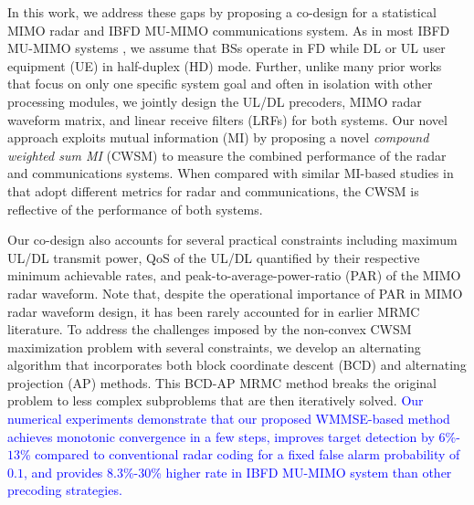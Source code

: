 \documentclass[9pt,journal]{IEEEtran}
\theoremstyle{definition}
\begin{document}
In this work, we address these gaps by proposing a co-design for a statistical MIMO radar and IBFD MU-MIMO communications system. As in most IBFD MU-MIMO systems \cite{biswas2018fdqos,singh2018transceiver,FD_WMMSE}, we assume that BSs operate in FD while DL or UL user equipment (UE) in half-duplex (HD) mode. Further, unlike many prior works that focus on only one specific system goal and often in isolation with other processing modules, we jointly design the UL/DL precoders, MIMO radar waveform matrix, and linear receive filters (LRFs) for both systems. Our novel approach exploits mutual information (MI) by proposing a novel \textit{compound weighted sum MI} (CWSM) to measure the combined performance of the radar and communications systems. When compared with similar MI-based studies in \cite{biswas2018fdqos,singh2018transceiver,he2019performance} that adopt different metrics for radar and communications, the CWSM is reflective of the performance of both systems. 

Our co-design also accounts for several practical constraints including maximum UL/DL transmit power, QoS of the UL/DL quantified by their respective minimum achievable rates, and peak-to-average-power-ratio (PAR) of the MIMO radar waveform. %
Note that, despite the operational importance of PAR in MIMO radar waveform design, it has been rarely accounted for in earlier MRMC literature. To address the challenges imposed by the non-convex CWSM maximization problem with several constraints, we develop an alternating algorithm that incorporates both block coordinate descent (BCD) and alternating projection (AP) methods. This BCD-AP MRMC method breaks the original problem to less complex subproblems that are then iteratively solved. \textcolor{blue}{Our numerical experiments demonstrate that our proposed WMMSE-based method achieves monotonic convergence in a few steps, improves target detection by $6$\%-$13$\% compared to conventional radar coding for a fixed false alarm probability of $0.1$, and provides $8.3$\%-$30$\% higher rate in IBFD MU-MIMO system than other precoding strategies.} %
\end{document}
